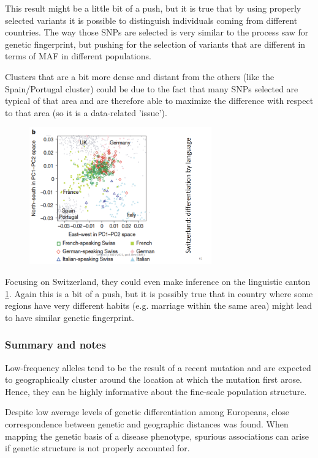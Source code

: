 This result might be a little bit of a push, but it is true that by using properly selected variants it is possible to distinguish individuals coming from different countries. The way those SNPs are selected is very similar to the process saw for genetic fingerprint, but pushing for the selection of variants that are different in terms of MAF in different populations. 

Clusters that are a bit more dense and distant from the others (like the Spain/Portugal cluster) could be due to the fact that many SNPs selected are typical of that area and are therefore able to maximize the difference with respect to that area (so it is a data-related 'issue').

\begin{figure}
	\centering
	\includegraphics[width=0.7\textwidth]{Images/PCA_swiss.PNG}
	\caption{\label{fig: PCA_swiss}}
\end{figure}

Focusing on Switzerland, they could even make inference on the linguistic canton \ref*{fig: PCA_swiss}. Again this is a bit of a push, but it is possibly true that in country where some regions have very different habits (e.g. marriage within the same area) might lead to have similar genetic fingerprint. 


\subsubsection*{Summary and notes}
Low-frequency alleles tend to be the result of a recent mutation and are expected to geographically cluster around the location at which the mutation first arose. Hence, they can be highly informative about the fine-scale population structure.

Despite low average levels of genetic differentiation among Europeans, close correspondence between genetic and geographic distances was
found. When mapping the genetic basis of a disease phenotype, spurious
associations can arise if genetic structure is not properly accounted for.



